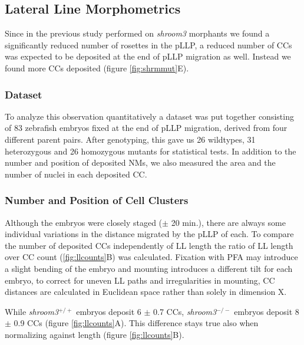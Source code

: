 \documentclass[10pt, b5paper, singlespacinge, twoside]{reedthesis} %
\theoremstyle{definition}
\theoremstyle{definition}
\theoremstyle{definition}
\theoremstyle{remark}
\begin{document}
\hypertarget{lateral-line-morphometrics}{%
\subsection{Lateral Line Morphometrics}\label{lateral-line-morphometrics}}

Since in the previous study performed on \emph{shroom3} morphants we found a significantly reduced number of rosettes in the pLLP, a reduced number of CCs was expected to be deposited at the end of pLLP migration as well. Instead we found more CCs deposited (figure \ref{fig:shrmmut}E).

\hypertarget{dataset}{%
\subsubsection{Dataset}\label{dataset}}

To analyze this observation quantitatively a dataset was put together consisting of 83 zebrafish embryos fixed at the end of pLLP migration, derived from four different parent pairs. After genotyping, this gave us 26 wildtypes, 31 heterozygous and 26 homozygous mutants for statistical tests. In addition to the number and position of deposited NMs, we also measured the area and the number of nuclei in each deposited CC.

\hypertarget{res-ccounts}{%
\subsubsection{Number and Position of Cell Clusters}\label{res-ccounts}}

Although the embryos were closely staged (\(\pm\) 20 min.), there are always some individual variations in the distance migrated by the pLLP of each. To compare the number of deposited CCs independently of LL length the ratio of LL length over CC count (\ref{fig:llcounts}B) was calculated. Fixation with PFA may introduce a slight bending of the embryo and mounting introduces a different tilt for each embryo, to correct for uneven LL paths and irregularities in mounting, CC distances are calculated in Euclidean space rather than solely in dimension X.

While \emph{shroom3}\(^{+/+}\) embryos deposit 6 \(\pm\) 0.7 CCs, \emph{shroom3}\(^{-/-}\) embryos deposit 8 \(\pm\) 0.9 CCs (figure \ref{fig:llcounts}A). This difference stays true also when normalizing against length (figure \ref{fig:llcounts}B).
\end{document}
